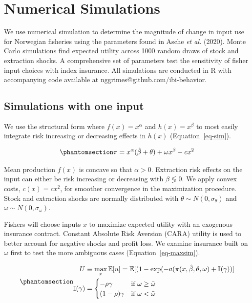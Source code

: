 \documentclass[
  letterpaper,
  DIV=11,
  numbers=noendperiod]{scrartcl}
\theoremstyle{plain}
\theoremstyle{plain}
\theoremstyle{remark}
\begin{document}
\section{Numerical Simulations}\label{sec-sim}

We use numerical simulation to determine the magnitude of change in
input use for Norwegian fisheries using the parameters found in Asche
\emph{et al.} (2020). Monte Carlo simulations find expected utility
across 1000 random draws of stock and extraction shocks. A comprehensive
set of parameters test the sensitivity of fisher input choices with
index insurance. All simulations are conducted in R with accompanying
code available at nggrimes@github.com/ibi-behavior.

\subsection{Simulations with one
input}\label{simulations-with-one-input}

We use the structural form where \(f(x)=x^\alpha\) and \(h(x)=x^\beta\)
to most easily integrate risk increasing or decreasing effects in
\(h(x)\) (Equation~\ref{eq-sim}).

\begin{equation}\phantomsection\label{eq-sim}{
\pi=x^\alpha(\hat\beta+\theta)+\omega x^\beta-cx^2
}\end{equation}

Mean production \(f(x)\) is concave so that \(\alpha>0\). Extraction
risk effects on the input can either be risk increasing or decreasing
with \(\beta\lessgtr0\). We apply convex costs, \(c(x)=cx^2\), for
smoother convergence in the maximization procedure. Stock and extraction
shocks are normally distributed with \(\theta\sim N(0,\sigma_{\theta})\)
and \(\omega\sim N(0,\sigma_{\omega})\).

Fishers will choose inputs \(x\) to maximize expected utility with an
exogenous insurance contract. Constant Absolute Risk Aversion (CARA)
utility is used to better account for negative shocks and profit loss.
We examine insurance built on \(\omega\) first to test the more
ambiguous cases (Equation~\ref{eq-maxsim}).

\begin{equation}\phantomsection\label{eq-maxsim}{
\begin{aligned}
U&\equiv\max_{x}\mathbb{E}[u]=\mathbb{E}[(1-\exp(-a(\pi(x,\hat\beta,\theta,\omega)+\mathbb{I}(\gamma))]\\
\mathbb{I}(\gamma)&=\begin{cases}-\rho\gamma & \text{if } \omega\ge \bar\omega\\
(1-\rho)\gamma & \text{if } \omega<\bar\omega
\end{cases}
\end{aligned}
}\end{equation}
\end{document}
